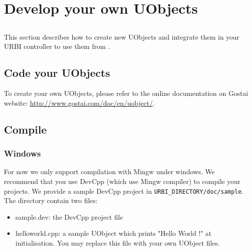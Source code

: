 
\section{Develop your own UObjects}
\label{webots.ownuobjects}%

\subsection{}\label{webots.ownuobjects.intro}%

 This section describes how to create new UObjects and integrate them
in your URBI controller to use them from .


\subsection{Code your UObjects}
\label{webots.ownuobjects.code}%

   To create your own UObjects, please refer to the online documentation
  on Gostai website: \url{http://www.gostai.com/doc/en/uobject/}.


\subsection{Compile}
\label{webots.ownuobjects.compile}%

\subsubsection{Windows}
\label{webots.ownuobjects.compile.windows}%

     For now we only support compilation with Mingw under windows. We
    recommend that you use DevCpp (which use Mingw compiler) to compile
    your projects.
    We provide a sample DevCpp project in \nolinkurl{URBI_DIRECTORY/doc/sample}.
    The directory contain two files:
 \begin{itemize}

\item{}         sample.dev: the DevCpp project file



\item{}         helloworld.cpp: a sample UObject which prints "Hello World !" at
        initialisation. You may replace this file with your own UObject
        files.


\end{itemize}


